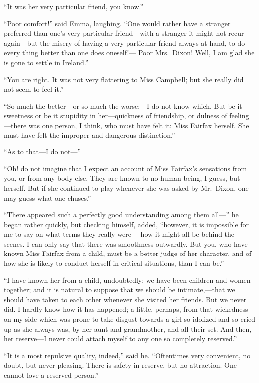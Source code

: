 ``It was her very particular friend, you know.''

``Poor comfort!'' said Emma, laughing.  ``One would rather have a stranger
preferred than one's very particular friend---with a stranger it might
not recur again---but the misery of having a very particular friend
always at hand, to do every thing better than one does oneself!---%
Poor Mrs.\ Dixon!  Well, I am glad she is gone to settle in Ireland.''

``You are right.  It was not very flattering to Miss Campbell;
but she really did not seem to feel it.''

``So much the better---or so much the worse:---I do not know which.
But be it sweetness or be it stupidity in her---quickness of friendship,
or dulness of feeling---there was one person, I think, who must have
felt it:  Miss Fairfax herself.  She must have felt the improper
and dangerous distinction.''

``As to that---I do not---''

``Oh! do not imagine that I expect an account of Miss Fairfax's
sensations from you, or from any body else.  They are known to no
human being, I guess, but herself.  But if she continued to play
whenever she was asked by Mr.\ Dixon, one may guess what one chuses.''

``There appeared such a perfectly good understanding among them all---''
he began rather quickly, but checking himself, added, ``however, it
is impossible for me to say on what terms they really were---%
how it might all be behind the scenes.  I can only say that there
was smoothness outwardly.  But you, who have known Miss Fairfax from
a child, must be a better judge of her character, and of how she
is likely to conduct herself in critical situations, than I can be.''

``I have known her from a child, undoubtedly; we have been children
and women together; and it is natural to suppose that we should
be intimate,---that we should have taken to each other whenever
she visited her friends.  But we never did.  I hardly know how it
has happened; a little, perhaps, from that wickedness on my side
which was prone to take disgust towards a girl so idolized
and so cried up as she always was, by her aunt and grandmother,
and all their set.  And then, her reserve---I never could attach
myself to any one so completely reserved.''

``It is a most repulsive quality, indeed,'' said he.  ``Oftentimes
very convenient, no doubt, but never pleasing.  There is safety
in reserve, but no attraction.  One cannot love a reserved person.''

